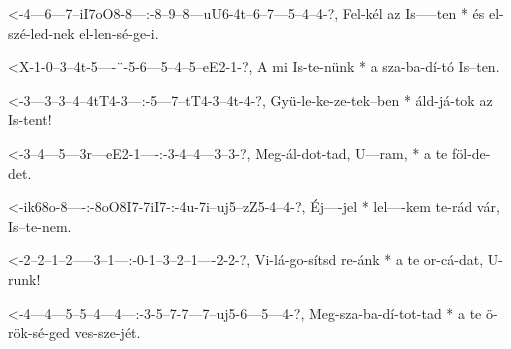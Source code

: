 

  {<-4---6---7--iI7oO8-8---:-8--9--8---uU6-4t--6--7---5--4--4-?,}
  {  Fel-kél az Is-----ten * és el-szé-led-nek el-len-sé-ge-i.}

  {<X-1-0--3--4t-5----¨-5-6---5--4--5--eE2-1-?,}
  {   A mi Is-te-nünk * a sza-ba-dí-tó Is--ten.}

  {<-3---3--3--4--4tT4-3---:-5---7--tT4-3--4t-4-?,}
  {  Gyü-le-ke-ze-tek--ben * áld-já-tok az Is-tent!}



  {<-3--4---5---3r---eE2-1----:-3-4--4---3--3-?,}
  {  Meg-ál-dot-tad, U---ram, * a te föl-de-det.}

  {<-ik68o-8----:-8oO8I7-7iI7-:-4u-7i--uj5--zZ5-4--4-?,}
  {  Éj----jel  * lel----kem    te-rád vár, Is--te-nem.}


  {<-2--2--1--2-----3--1---:-0-1--3--2--1----2-2-?,}
  {  Vi-lá-go-sítsd re-ánk * a te or-cá-dat, U-runk!}


  {<-4---4---5--5--4---4---:-3-5--7-7---7--uj5-6---5---4-?,}
  {  Meg-sza-ba-dí-tot-tad * a te ö-rök-sé-ged ves-sze-jét.}



